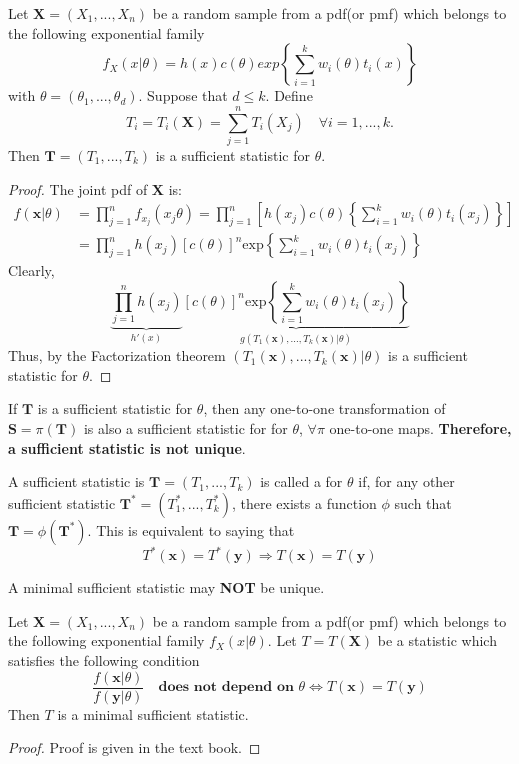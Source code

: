 \begin{theorem}
    Let $\boldsymbol{X} = (X_1,...,X_n)$ be a random sample from a pdf(or pmf) which belongs to the following exponential family
    $$
    f_X(x|\theta) = h(x)c(\theta)exp 
    \left \{ 
    \sum_{i=1}^{k}w_i(\theta)t_i(x)
    \right \}
    $$
    with $\theta = (\theta_1,...,\theta_d)$. Suppose that $d \leq k$. Define 
    $$T_i = T_i(\boldsymbol{X}) = \sum_{j=1}^{n}T_i(X_j)
    \quad \forall i=1,...,k.$$
    Then $\boldsymbol{T} = (T_1,...,T_k)$ is a sufficient statistic for $\theta$.
\end{theorem}
\begin{proof}
    The joint pdf of $\boldsymbol{X}$ is:
    \begin{align*}
    f(\boldsymbol{x}|\theta) & = 
    \prod_{j=1}^{n}f_{x_j}(x_j \theta) 
    = \prod_{j=1}^{n} \left[
    h(x_j)c(\theta) \left \{
    \sum_{i=1}^{k}w_i(\theta)t_i(x_j)
    \right\}
    \right ] \\
    & = \prod_{j=1}^{n}h(x_j)[c(\theta)]^n \mathrm{exp} \left \{
    \sum_{i=1}^{k}w_i(\theta)t_i(x_j)
    \right\}
    \end{align*}
    Clearly, 
    $$
    \underbrace{ \prod_{j=1}^{n}h(x_j)}_{h'(x)}
    \underbrace{[c(\theta)]^n\mathrm{exp} \left \{
    \sum_{i=1}^{k}w_i(\theta)t_i(x_j)
    \right\}}_{g(T_1(\boldsymbol{x}),...,T_k(\boldsymbol{x})|\theta)}
    $$
    Thus, by the Factorization theorem $(T_1(\boldsymbol{x}),...,T_k(\boldsymbol{x})|\theta)$ is a sufficient statistic for $\theta$.
\end{proof}
 If $\boldsymbol{T}$ is a sufficient statistic for $\theta$, then any one-to-one transformation of $\boldsymbol{S} = \pi(\boldsymbol{T})$ is also a sufficient statistic for for $\theta$, $\forall \pi$ one-to-one maps. \textbf{Therefore, a sufficient statistic is not unique}. 
\begin{definition}
    A sufficient statistic is $\boldsymbol{T} = (T_1,...,T_k)$ is called a  for $\theta$ if, for any other sufficient statistic $\boldsymbol{T}^* = (T_1^*,...,T_k^*)$, there exists a function $\phi$ such that $\boldsymbol{T} = \phi(\boldsymbol{T}^*)$. This is equivalent to saying that
    $$
    T^*(\boldsymbol{x}) = T^*(\boldsymbol{y}) \Longrightarrow T(\boldsymbol{x}) = T(\boldsymbol{y})
    $$
\end{definition}
 A minimal sufficient statistic may \textbf{NOT} be unique.
\begin{theorem}
    Let $\boldsymbol{X} = (X_1,...,X_n)$ be a random sample from a pdf(or pmf) which belongs to the following exponential family $f_X(x|\theta)$. Let $T = T(\boldsymbol{X})$ be a statistic which satisfies the following condition
    $$
    \frac{f(\boldsymbol{x}|\theta)}{f(\boldsymbol{y}|\theta)}\quad \textbf{does not depend on } \theta
    \iff T(\boldsymbol{x}) =  T(\boldsymbol{y})
    $$
    Then $T$ is a minimal sufficient statistic. 
\end{theorem}
\begin{proof}
    Proof is given in the text book.
\end{proof}